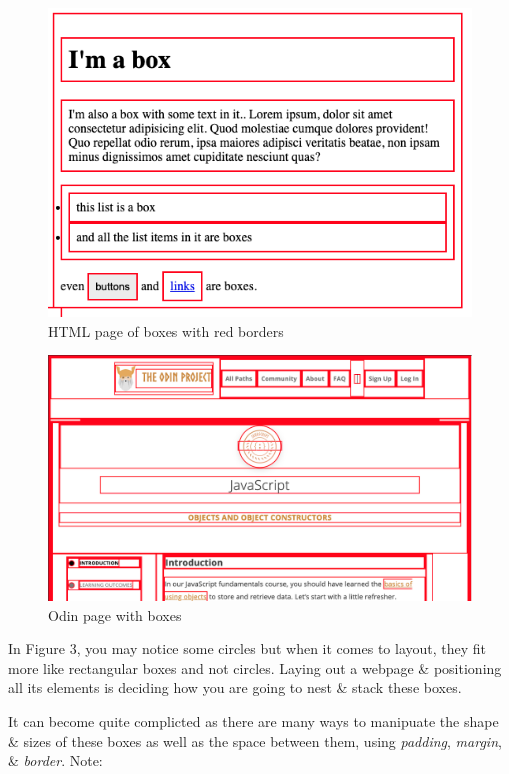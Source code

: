 \documentclass{article}
\begin{document}
	\begin{figure}[H]
		\includegraphics[width=\linewidth]{OdinProjectPics/boxes.png}
		\caption{HTML page of boxes with red borders}
		\label{boxes}
	\end{figure}

	\begin{figure}[H]
		\includegraphics[width=\linewidth]{OdinProjectPics/odin-lined.png}
		\caption{Odin page with boxes}
		\label{Another example of boxes}
	\end{figure}

	In Figure 3, you may notice some circles but when it comes to layout, they fit more like rectangular boxes and not circles.
	Laying out a webpage \& positioning all its elements is deciding how you are going to nest \& stack these boxes.

	It can become quite complicted as there are many ways to manipuate the shape \& sizes of these boxes as well as the space between them, using 
	{\em padding}, {\em margin}, \& {\em border}. Note:
\end{document}
